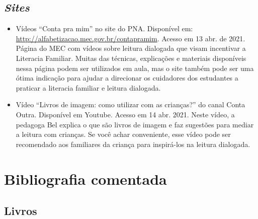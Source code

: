 \documentclass[11pt]{extarticle}
\begin{document}
\subsection{\textit{Sites}}

\begin{itemize}
\item Vídeos “Conta pra mim” no site do PNA. Disponível em: \url{http://alfabetizacao.mec.gov.br/contapramim}. 
Acesso em 13 abr. de 2021.
Página do MEC com vídeos sobre leitura dialogada que visam incentivar a Literacia Familiar. Muitas das 
técnicas, explicações e materiais disponíveis nessa página podem ser utilizados em aula, mas o site também 
pode ser uma ótima indicação para ajudar a direcionar os cuidadores dos estudantes a praticar 
a literacia familiar e leitura dialogada.

\item Vídeo “Livros de imagem: como utilizar com as crianças?” do canal Conta Outra. Disponível em Youtube. 
Acesso em 14 abr. 2021. 
Neste vídeo, a pedagoga Bel explica o que são livros de imagem e faz sugestões para mediar a leitura com 
crianças. Se você achar conveniente, esse vídeo pode ser recomendado aos familiares da criança 
para inspirá-los na leitura dialogada. 

\end{itemize}

\section{Bibliografia comentada}

\subsection{Livros}
\end{document}

